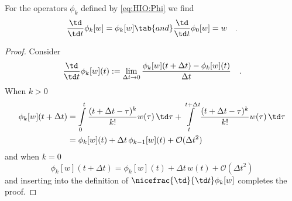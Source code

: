 \begin{lemma}{}{}
	For the operators $\phi_k$ defined by \eqref{eq:HIO:Phi} we find
	\begin{equation}
	\frac{\td}{\td t} \phi_k[w] = \phi_k[w] \tab{and} \frac{\td}{\td t} \phi_0[w]=w
	 \quad .
	\end{equation}
\end{lemma}
\begin{proof}
	Consider
	\begin{equation}
	\frac{\td}{\td t} \phi_k[w](t) := \lim_{\Delta t \to 0} \frac{\phi_k[w](t+\Delta t)
	- \phi_k[w](t)}{\Delta t} \quad .
	\end{equation}
	When $k > 0$
	\begin{align}
	\phi_k[w](t+\Delta t) &= \int\limits_0^{t} \frac{(t+\Delta t-\tau)^k}{k!} w(\tau) \, 
	\td \tau 
	+ \int\limits_t^{t+\Delta t} \frac{(t+\Delta t-\tau)^k}{k!} w(\tau) \, \td \tau \\
	&= \phi_k[w](t) + \Delta t \, \phi_{k-1}[w](t) 
	+ \mathcal{O}(\Delta t^2)
	\end{align}
	and when $k=0$
	\begin{equation}
	\phi_k[w](t+\Delta t)  = \phi_k[w](t) + \Delta t \, w(t) + \mathcal{O}(\Delta t^2)
	\end{equation}
	and inserting into the definition of $\nicefrac{\td}{\td t}\phi_k[w]$ completes the 
	proof.
\end{proof}

